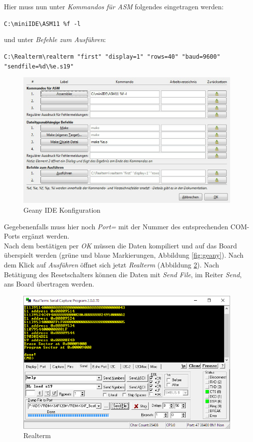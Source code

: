     Hier muss nun unter \textit{Kommandos für ASM} folgendes eingetragen werden:
    \begin{center}
        \texttt{C:\textbackslash{}miniIDE\textbackslash{}ASM11 \%f -l}
    \end{center}
    und unter \textit{Befehle zum Ausführen}:
    \begin{center}
        \texttt{C:\textbackslash{}Realterm\textbackslash{}realterm "{}first"{} "{}display=1"{} "{}rows=40"{} "{}baud=9600"{} "{}sendfile=\%d\textbackslash{}\%e.s19"{}}
    \end{center}
    \begin{figure}[H]
        \centering
        \label{geany-config}
        \includegraphics[scale=0.5]{img/geany-config.png}    
        \caption{Geany IDE Konfiguration}
    \end{figure}
    Gegebenenfalls muss hier noch \textit{Port=} mit der Nummer des entsprechenden COM-Ports ergänzt werden.
    \\
    Nach dem bestätigen per \textit{OK} müssen die Daten kompiliert und auf das Board überspielt werden (grüne und blaue Markierungen, Abbildung \ref{fig:geany}).
    Nach dem Klick auf \textit{Ausführen} öffnet sich jetzt \textit{Realterm} (Abbildung \ref{fig:realterm}). Nach Betätigung des Resetschalters können die Daten mit 
    \textit{Send File}, im Reiter \textit{Send}, ans Board übertragen werden. 
    \begin{figure}[H]
        \centering
        \includegraphics[scale=0.5]{img/realterm.png}    
        \caption{Realterm}
        \label{fig:realterm}
    \end{figure}

